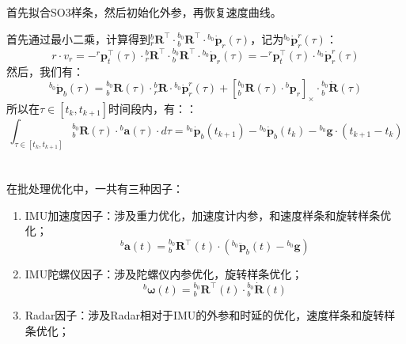 \documentclass[12pt, onecolumn]{article}
\newcommand\normf{\fangsong}
\newcommand\liehat[1]{\left[ #1 \right]_\times}
\begin{document}
	\section{\normf{分步初始化}}
	首先拟合SO3样条，然后初始化外参，再恢复速度曲线。
	
	首先通过最小二乘，计算得到${^{b}_{r}\boldsymbol{R}^\top}\cdot{^{b_0}_{b}\boldsymbol{R}^\top}\cdot{^{b_0}\dot{\boldsymbol{p}}_r(\tau)}$，记为${^{b_0}\dot{\boldsymbol{p}}^r_r(\tau)}$：
	\begin{equation}
	r\cdot v_r=-
	{^{r}\boldsymbol{p}_t^\top(\tau)}\cdot{^{b}_{r}\boldsymbol{R}^\top}\cdot{^{b_0}_{b}\boldsymbol{R}^\top}\cdot{^{b_0}\dot{\boldsymbol{p}}_r(\tau)}
	=-{^{r}\boldsymbol{p}_t^\top(\tau)}\cdot{^{b_0}\dot{\boldsymbol{p}}^r_r(\tau)}
	\end{equation}
	然后，我们有：
	\begin{equation}
	{^{b_0}\dot{\boldsymbol{p}}_b(\tau)}={^{b_0}_{b}\boldsymbol{R}}(\tau)\cdot{^{b}_{r}\boldsymbol{R}}\cdot{^{b_0}\dot{\boldsymbol{p}}^r_r(\tau)}
	+\liehat{{^{b_0}_{b}\boldsymbol{R}(\tau)}\cdot{^{b}{\boldsymbol{p}}_r}}\cdot{^{b_0}_{b}\dot{\boldsymbol{R}}(\tau)}
	\end{equation}
	所以在$\tau\in[t_k,t_{k+1}]$时间段内，有：：
	\begin{equation}
	\int_{\tau\in[t_k,t_{k+1}]}{^{b_0}_{b}\boldsymbol{R}(\tau)}\cdot{^{b}\boldsymbol{a}(\tau)}\cdot d\tau=
	{^{b_0}\dot{\boldsymbol{p}}_b(t_{k+1})}-{^{b_0}\dot{\boldsymbol{p}}_b(t_k)}
	-{^{b_0}\boldsymbol{g}}\cdot (t_{k+1}-t_k)
	\end{equation}
	
	\section{\normf{批处理优化}}
	在批处理优化中，一共有三种因子：
	\begin{enumerate}
		\item IMU加速度因子：涉及重力优化，加速度计内参，和速度样条和旋转样条优化；
		\begin{equation}
		{^{b}\boldsymbol{a}(t)}={^{b_0}_{b}\boldsymbol{R}^\top(t)}\cdot\left( {^{b_0}\ddot{\boldsymbol{p}}_b(t)}-{^{b_0}\boldsymbol{g}}\right)
		\end{equation}
		
		\item IMU陀螺仪因子：涉及陀螺仪内参优化，旋转样条优化；
		\begin{equation}
		{^{b}\boldsymbol{\omega}(t)}={^{b_0}_{b}\boldsymbol{R}^\top(t)}\cdot{^{b_0}_{b}\dot{\boldsymbol{R}}(t)}
		\end{equation}
		
		\item Radar因子：涉及Radar相对于IMU的外参和时延的优化，速度样条和旋转样条优化；
		
	\end{enumerate}
\end{document}
